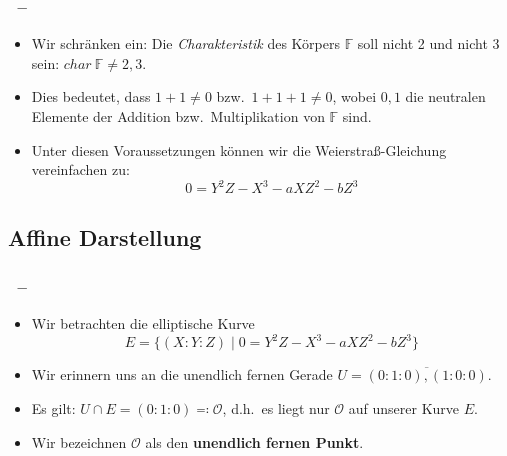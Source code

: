 \documentclass{beamer}
\theoremstyle{plain}
\theoremstyle{definition}
\theoremstyle{rem}
\newcommand{\patinf}{\mathcal{O}}
\begin{document}
\begin{frame}
\frametitle{\insertsection~--~\insertsubsection}
\begin{itemize}[<+->]
	\item  Wir schränken ein: Die \textit{Charakteristik} des Körpers $\mathbb{F}$ soll nicht 2 und nicht 3 sein: $char \: \mathbb{F} \neq 2,3$.
	\item Dies bedeutet, dass $1 + 1 \neq 0$ bzw.\ $1 + 1 + 1 \neq 0$, wobei $0,1$ die neutralen Elemente der Addition bzw.\ Multiplikation von $\mathbb{F}$ sind.
	\item Unter diesen Voraussetzungen können wir die Weierstraß-Gleichung vereinfachen zu:
    \begin{equation*}
        0=Y^2Z - X^3 - aXZ^2 - bZ^3
    \end{equation*}
\end{itemize}
\end{frame}

\subsection{Affine Darstellung}

\begin{frame}
\frametitle{\insertsection~--~\insertsubsection}
\begin{itemize}[<+->]
	\item Wir betrachten die elliptische Kurve
		\begin{equation*}
			E=\{(X:Y:Z)\mid 0=Y^2Z - X^3 - aXZ^2 - bZ^3\}
		\end{equation*}
	\item Wir erinnern uns an die unendlich fernen Gerade $U=\overline{(0:1:0),(1:0:0)}$.
	\item Es gilt: $U\cap E=(0:1:0)\eqqcolon\patinf$, d.h.\ es liegt nur $\patinf$ auf unserer Kurve $E$.
	\item Wir bezeichnen $\patinf$ als den \textbf{unendlich fernen Punkt}.
\end{itemize}
\end{frame}

\end{document}
